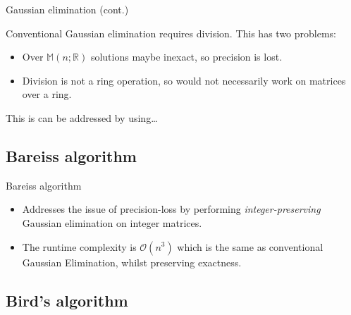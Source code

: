 \documentclass{beamer}
\begin{document}
\begin{frame}{Gaussian elimination (cont.)}

    Conventional Gaussian elimination requires division.
    This has two problems:
    \begin{itemize}
        \item Over $\mathbb{M}(n; \mathbb{R})$ solutions maybe inexact, so precision is lost.
        \item Division is not a ring operation,
            so would not necessarily work on matrices over a ring.
    \end{itemize}

    This is can be addressed by using\dots

\end{frame}

\subsection{Bareiss algorithm}

\begin{frame}{Bareiss algorithm}

    \begin{itemize}

        \item Addresses the issue of precision-loss by performing \emph{integer-preserving}
            Gaussian elimination on integer matrices.

        \item The runtime complexity is $\mathcal{O}(n^3)$ which is the same as conventional
            Gaussian Elimination, whilst preserving exactness.

    \end{itemize}

\end{frame}

\subsection{Bird's algorithm}
\end{document}
